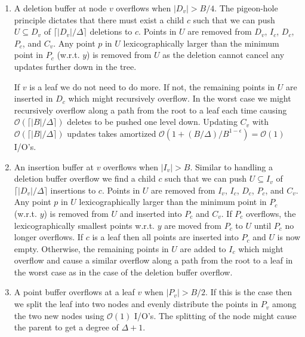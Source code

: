 \documentclass[twoside,11pt,openright]{report}
\begin{document}
\begin{enumerate}[label=(\roman*)]
	\item\label{update:del} A deletion buffer at node $v$ overflows when $\vert D_v \vert > B/4$. The pigeon-hole principle dictates that there must exist a child $c$ such that we can push $U \subseteq D_v$ of $\lceil \vert D_v \vert / \Delta \rceil$ deletions to $c$. Points in $U$ are removed from $D_v$, $I_c$, $D_c$, $P_c$, and $C_v$. Any point $p$ in $U$ lexicographically larger than the minimum point in $P_c$ (w.r.t. $y$) is removed from $U$ as the deletion cannot cancel any updates further down in the tree.
	
	If $v$ is a leaf we do not need to do more. If not, the remaining points in $U$ are inserted in $D_c$ which might recursively overflow. In the worst case we might recursively overflow along a path from the root to a leaf each time causing $\mathcal{O}(\lceil \vert B \vert / \Delta \rceil)$ deletes to be pushed one level down. Updating $C_v$ with $\mathcal{O}(\lceil \vert B \vert / \Delta \rceil)$ updates takes amortized $\mathcal{O}(1+ (B/\Delta) / B^{1-\epsilon}) = \mathcal{O}(1)$ I/O's.
	
	\item\label{update:ins} An insertion buffer at $v$ overflows when $\vert I_v \vert > B$. Similar to handling a deletion buffer overflow we find a child $c$ such that we can push $U \subseteq I_v$ of $\lceil \vert D_v \vert / \Delta \rceil$ insertions to $c$. Points in $U$ are removed from $I_v$, $I_c$, $D_c$, $P_c$, and $C_v$.
	Any point $p$ in $U$ lexicographically larger than the minimum point in $P_c$ (w.r.t. $y$) is removed from $U$ and inserted into $P_c$ and $C_v$.
	If $P_c$ overflows, the lexicographically smallest points w.r.t. $y$ are moved from $P_c$ to $U$ until $P_c$ no longer overflows.
	If $c$ is a leaf then all points are inserted into $P_c$ and $U$ is now empty.
	Otherwise, the remaining points in $U$ are added to $I_c$ which might overflow and cause a similar overflow along a path from the root to a leaf in the worst case as in the case of the deletion buffer overflow.
	
	\item\label{update:pbo} A point buffer overflows at a leaf $v$ when $\vert P_v \vert > B/2$. If this is the case then we split the leaf into two nodes and evenly distribute the points in $P_v$ among the two new nodes using $\mathcal{O}(1)$ I/O's. The splitting of the node might cause the parent to get a degree of $\Delta+1$.
	

\end{enumerate}
\end{document}

